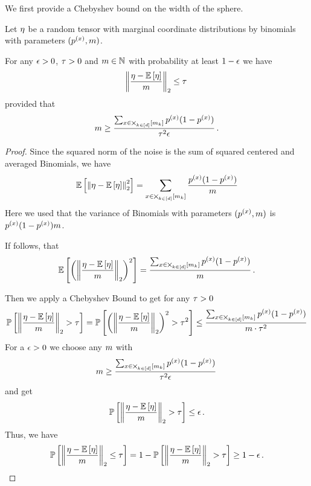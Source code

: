 We first provide a Chebyshev bound on the width of the sphere.

\begin{theorem}\label{the:sphereBoundVariance}
	Let $\eta$ be a random tensor with marginal coordinate distributions by binomials with parameters $(p^{(x)},m)$.

	For any $\epsilon>0$, $\tau>0$ and $m\in\mathbb{N}$ with probability at least $1-\epsilon$ we have
		\[ \left\|\frac{\eta-\mathbb{E}\left[\eta\right]}{m}\right\|_{2} \leq   \tau \, \]
	provided that
		\[ m \geq  \frac{ \sum_{x\in\bigtimes_{k\in[d]}[m_{k}]} p^{(x)}(1-p^{(x)})}{\tau^2 \epsilon} \, . \]
\end{theorem}
\begin{proof}
	Since the squared norm of the noise is the sum of squared centered and averaged Binomials, we have
		\[  \mathbb{E}\left[\left\|\eta-\mathbb{E}\left[\eta\right]\right\|_{2}^2\right]  
		= \sum_{x\in\bigtimes_{k\in[d]}[m_{k}]} \frac{p^{(x)}(1-p^{(x)})}{m} \]
	Here we used that the variance of Binomials with parameters $(p^{(x)},m)$ is $p^{(x)}(1-p^{(x)}) m$.
	
	If follows, that 
		\[ \mathbb{E}\left[\left(\left\|\frac{\eta-\mathbb{E}\left[\eta\right]}{m}\right\|_{2}\right)^2\right] =  \frac{ \sum_{x\in\bigtimes_{k\in[d]}[m_{k}]} p^{(x)}(1-p^{(x)})}{m} \, . \]
	
	Then we apply a Chebyshev Bound to get for any $\tau>0$
	\begin{align}
		\mathbb{P}\left[\left\|\frac{\eta-\mathbb{E}\left[\eta\right]}{m}\right\|_{2} > \tau\right]
		= \mathbb{P}\left[\left(\left\|\frac{\eta-\mathbb{E}\left[\eta\right]}{m}\right\|_{2}\right)^2 > \tau^2\right]
		\leq \frac{ \sum_{x\in\bigtimes_{k\in[d]}[m_{k}]} p^{(x)}(1-p^{(x)})}{m \cdot \tau^2}
	\end{align} 
	For a $\epsilon>0$ we choose any $m$ with
		\[ m \geq  \frac{ \sum_{x\in\bigtimes_{k\in[d]}[m_{k}]} p^{(x)}(1-p^{(x)})}{\tau^2 \epsilon} \, \]
	and get 
	\begin{align}
		\mathbb{P}\left[\left\|\frac{\eta-\mathbb{E}\left[\eta\right]}{m}\right\|_{2} > \tau\right] \leq \epsilon \, .
	\end{align} 
	Thus, we have 
	\begin{align}
		\mathbb{P}\left[\left\|\frac{\eta-\mathbb{E}\left[\eta\right]}{m}\right\|_{2} \leq \tau\right] = 1 - \mathbb{P}\left[\left\|\frac{\eta-\mathbb{E}\left[\eta\right]}{m}\right\|_{2} > \tau\right]  \geq 1-\epsilon \, .
	\end{align} 
\end{proof}


